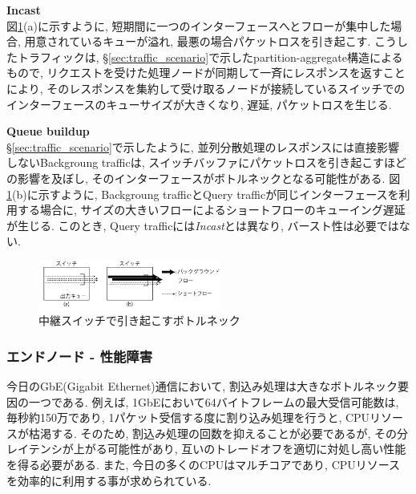 \documentclass[11pt, a4paper, uplatex]{jsarticle}
\begin{document}
{\bf Incast}\\
\label{subsec:incast}
図\ref{fig:impair}(a)に示すように, 短期間に一つのインターフェースへとフローが集中した場合, 用意されているキューが溢れ,
最悪の場合パケットロスを引き起こす.
こうしたトラフィックは, \S \ref{sec:traffic_scenario}で示したpartition-aggregate構造によるもので,
リクエストを受けた処理ノードが同期して一斉にレスポンスを返すことにより,
そのレスポンスを集約して受け取るノードが接続しているスイッチでのインターフェースのキューサイズが大きくなり, 遅延, パケットロスを生じる.

{\bf Queue buildup}\\
\label{subsec:queue}
\S \ref{sec:traffic_scenario}で示したように, 並列分散処理のレスポンスには直接影響しないBackgroung trafficは,
スイッチバッファにパケットロスを引き起こすほどの影響を及ぼし, そのインターフェースがボトルネックとなる可能性がある.
図\ref{fig:impair}(b)に示すように, Backgroung trafficとQuery trafficが同じインターフェースを利用する場合に,
サイズの大きいフローによるショートフローのキューイング遅延が生じる.
このとき, Query trafficには{\it Incast}とは異なり, バースト性は必要ではない.

\begin{figure}[t]
    \begin{center}
    \includegraphics[autoebb, width=170pt]{./img/impairments.pdf}
    \caption{中継スイッチで引き起こすボトルネック}
    \label{fig:impair}
    \end{center}
\end{figure}


\subsubsection{エンドノード - 性能障害}
今日のGbE(Gigabit Ethernet)通信において, 割込み処理は大きなボトルネック要因の一つである.
例えば, 1GbEにおいて64バイトフレームの最大受信可能数は, 毎秒約150万であり, 1パケット受信する度に割り込み処理を行うと,
CPUリソースが枯渇する.
そのため, 割込み処理の回数を抑えることが必要であるが, その分レイテンシが上がる可能性があり, 互いのトレードオフを適切に対処し高い性能を得る必要がある.
また, 今日の多くのCPUはマルチコアであり, CPUリソースを効率的に利用する事が求められている.
\end{document}
